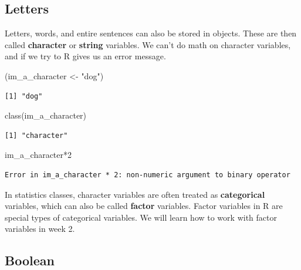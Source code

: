 \documentclass[
  letterpaper,
  DIV=11,
  numbers=noendperiod,
  oneside]{scrreprt}
\newenvironment{Shaded}{\begin{snugshade}}{\end{snugshade}}
\newcommand{\DecValTok}[1]{\textcolor[rgb]{0.68,0.00,0.00}{#1}}
\newcommand{\FunctionTok}[1]{\textcolor[rgb]{0.28,0.35,0.67}{#1}}
\newcommand{\NormalTok}[1]{\textcolor[rgb]{0.00,0.23,0.31}{#1}}
\newcommand{\OtherTok}[1]{\textcolor[rgb]{0.00,0.23,0.31}{#1}}
\newcommand{\SpecialCharTok}[1]{\textcolor[rgb]{0.37,0.37,0.37}{#1}}
\newcommand{\StringTok}[1]{\textcolor[rgb]{0.13,0.47,0.30}{#1}}
\begin{document}
\subsection{Letters}\label{letters}

Letters, words, and entire sentences can also be stored in objects.
These are then called \textbf{character} or \textbf{string} variables.
We can't do math on character variables, and if we try to R gives us an
error message.

\begin{Shaded}
\begin{Highlighting}[]
\NormalTok{(im\_a\_character }\OtherTok{\textless{}{-}} \StringTok{"dog"}\NormalTok{)}
\end{Highlighting}
\end{Shaded}

\begin{verbatim}
[1] "dog"
\end{verbatim}

\begin{Shaded}
\begin{Highlighting}[]
\FunctionTok{class}\NormalTok{(im\_a\_character)}
\end{Highlighting}
\end{Shaded}

\begin{verbatim}
[1] "character"
\end{verbatim}

\begin{Shaded}
\begin{Highlighting}[]
\NormalTok{im\_a\_character}\SpecialCharTok{*}\DecValTok{2}
\end{Highlighting}
\end{Shaded}

\begin{verbatim}
Error in im_a_character * 2: non-numeric argument to binary operator
\end{verbatim}

In statistics classes, character variables are often treated as
\textbf{categorical} variables, which can also be called \textbf{factor}
variables. Factor variables in R are special types of categorical
variables. We will learn how to work with factor variables in week 2.

\subsection{Boolean}\label{sec-logical}
\end{document}
